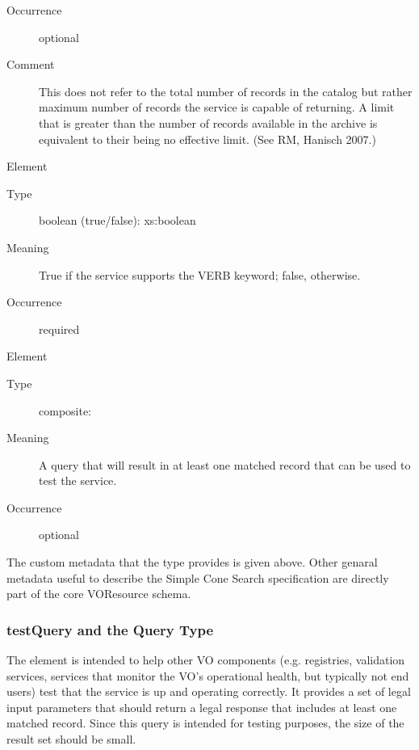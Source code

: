 \documentclass[11pt,a4paper]{ivoa} 
\begin{document}
\begin{generated}
\begin{bigdescription}
\begin{description}
\item[Occurrence] optional \item[Comment] This does not refer to the
total number of records in the catalog but rather maximum number of
records the service is capable of returning.  A limit that is greater
than the number of records available in the archive is equivalent to
their being no effective limit.  (See RM, Hanisch 2007.)
                     

\end{description} \item[Element \xmlel{verbosity}] \begin{description}
\item[Type] boolean (true/false): xs:boolean \item[Meaning] True if the
service supports the VERB keyword; false, otherwise.
                     
\item[Occurrence] required

\end{description} \item[Element \xmlel{testQuery}] \begin{description}
\item[Type] composite:  \item[Meaning] A query that will
result in at least one matched record that can be used to test the
service.  
                     
\item[Occurrence] optional

\end{description}


\end{bigdescription}\endgroup

\endgroup \end{generated}


The custom metadata that the  type provides is
given above. Other genaral metadata useful to describe the Simple Cone
Search specification are directly part of the core VOResource schema.

\subsubsection{testQuery and the Query Type}

The  element is intended to help other VO components
(e.g.  registries, validation services, services that monitor the VO's
operational health, but typically not end users) test that the service
is up and operating correctly. It provides a set of legal input
parameters that should return a legal response that includes at least
one matched record. Since this query is intended for testing purposes,
the size of the result set should be small.
\end{document}
